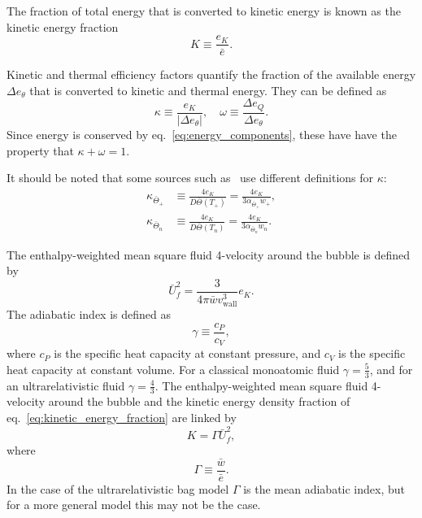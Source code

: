 The fraction of total energy that is converted to kinetic energy is known as the kinetic energy fraction
\begin{equation}
K \equiv \frac{e_K}{\bar{e}}.
\label{eq:kinetic_energy_fraction}
\end{equation}

Kinetic and thermal efficiency factors quantify the fraction of the available energy $\Delta e_\theta$
that is converted to kinetic and thermal energy.
They can be defined as
\begin{equation}
\kappa \equiv \frac{e_K}{| \Delta e_\theta |}, \quad
\omega \equiv \frac{\Delta e_Q}{\Delta e_\theta}.
\label{eq:kappa_omega}
\end{equation}
Since energy is conserved by eq.~\eqref{eq:energy_components},
these have have the property that $\kappa + \omega = 1$.

It should be noted that some sources such as~\cites[eq. 36]{giese_2020}[eq. 12, 14]{giese_2021}
use different definitions for $\kappa$:
\begin{align}
\kappa_{\bar{\Theta}_+} &\equiv \frac{4 e_K}{D \bar{\Theta}(T_+)} = \frac{4 e_K}{3 \alpha_{\bar{\Theta}_+} w_+},
\label{eq:kappa_thetabar_plus} \\
\kappa_{\bar{\Theta}_n} &\equiv \frac{4 e_K}{D \bar{\Theta}(T_n)} = \frac{4 e_K}{3 \alpha_{\bar{\Theta}_n} w_n}.
\label{eq:kappa_thetabar_n}
\end{align}

The enthalpy-weighted mean square fluid 4-velocity around the bubble is defined by
\begin{equation}
\bar{U}_f^2 = \frac{3}{4\pi \bar{w} v_\text{wall}^3} e_K.
\label{eq:ubarf2}
\end{equation}
The adiabatic index is defined as
\begin{equation}
\gamma \equiv \frac{c_P}{c_V},
\end{equation}
where $c_P$ is the specific heat capacity at constant pressure,
and $c_V$ is the specific heat capacity at constant volume.
For a classical monoatomic fluid $\gamma = \frac{5}{3}$,
and for an ultrarelativistic fluid $\gamma = \frac{4}{3}$.
The enthalpy-weighted mean square fluid 4-velocity around the bubble and
the kinetic energy density fraction of eq.~\eqref{eq:kinetic_energy_fraction} are linked by
\begin{equation}
K = \Gamma \bar{U}_f^2,
\label{eq:kinetic_energy_fraction2}
\end{equation}
where
\begin{equation}
\Gamma \equiv \frac{\bar{w}}{\bar{e}}.
\label{eq:mean_adiabatic_index}
\end{equation}
In the case of the ultrarelativistic bag model $\Gamma$ is the mean adiabatic index,
but for a more general model this may not be the case.

